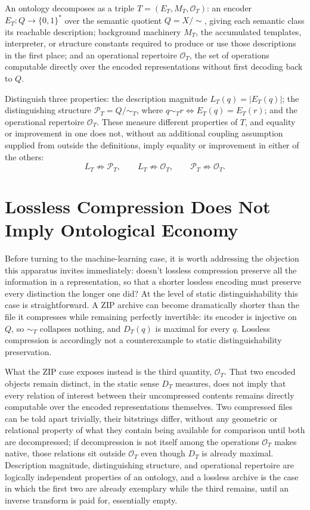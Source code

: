 An ontology decomposes as a triple $T = (E_T, M_T, \mathcal{O}_T)$: an encoder $E_T : Q \to \{0,1\}^\ast$ over the semantic quotient $Q = X/\!\sim$, giving each semantic class its reachable description; background machinery $M_T$, the accumulated templates, interpreter, or structure constants required to produce or use those descriptions in the first place; and an operational repertoire $\mathcal{O}_T$, the set of operations computable directly over the encoded representations without first decoding back to $Q$.

\begin{definition}
\label{def:threecoord}
Distinguish three properties: the description magnitude $L_T(q) = |E_T(q)|$; the distinguishing structure $\mathcal{P}_T = Q/\!\sim_T$, where $q \sim_T r \iff E_T(q) = E_T(r)$; and the operational repertoire $\mathcal{O}_T$. These measure different properties of $T$, and equality or improvement in one does not, without an additional coupling assumption supplied from outside the definitions, imply equality or improvement in either of the others:
\[
L_T \not\Rightarrow \mathcal{P}_T, \qquad L_T \not\Rightarrow \mathcal{O}_T, \qquad \mathcal{P}_T \not\Rightarrow \mathcal{O}_T.
\]
\end{definition}

\section{Lossless Compression Does Not Imply Ontological Economy}

Before turning to the machine-learning case, it is worth addressing the objection this apparatus invites immediately: doesn't lossless compression preserve all the information in a representation, so that a shorter lossless encoding must preserve every distinction the longer one did? At the level of static distinguishability this case is straightforward. A ZIP archive can become dramatically shorter than the file it compresses while remaining perfectly invertible: its encoder is injective on $Q$, so $\sim_T$ collapses nothing, and $D_T(q)$ is maximal for every $q$. Lossless compression is accordingly not a counterexample to static distinguishability preservation.

What the ZIP case exposes instead is the third quantity, $\mathcal{O}_T$. That two encoded objects remain distinct, in the static sense $D_T$ measures, does not imply that every relation of interest between their uncompressed contents remains directly computable over the encoded representations themselves. Two compressed files can be told apart trivially, their bitstrings differ, without any geometric or relational property of what they contain being available for comparison until both are decompressed; if decompression is not itself among the operations $\mathcal{O}_T$ makes native, those relations sit outside $\mathcal{O}_T$ even though $D_T$ is already maximal. Description magnitude, distinguishing structure, and operational repertoire are logically independent properties of an ontology, and a lossless archive is the case in which the first two are already exemplary while the third remains, until an inverse transform is paid for, essentially empty.

